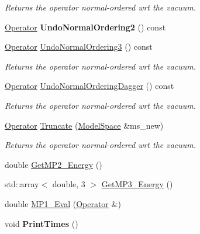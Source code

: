 \begin{DoxyCompactItemize}
\begin{DoxyCompactList}\small\item\em Returns the operator normal-\/ordered wrt the vacuum. \end{DoxyCompactList}\item 
\hypertarget{classOperator_a8681a11350622fd4c01ea48de0ef35e3}{\hyperlink{classOperator}{Operator} {\bfseries Undo\-Normal\-Ordering2} () const }\label{classOperator_a8681a11350622fd4c01ea48de0ef35e3}

\item 
\hypertarget{classOperator_a8a1f710b73b2a314877a275cff4d9e79}{\hyperlink{classOperator}{Operator} \hyperlink{classOperator_a8a1f710b73b2a314877a275cff4d9e79}{Undo\-Normal\-Ordering3} () const }\label{classOperator_a8a1f710b73b2a314877a275cff4d9e79}

\begin{DoxyCompactList}\small\item\em Returns the operator normal-\/ordered wrt the vacuum. \end{DoxyCompactList}\item 
\hypertarget{classOperator_a5ac0fc1807ea2cc48efe2e8ae8995c13}{\hyperlink{classOperator}{Operator} \hyperlink{classOperator_a5ac0fc1807ea2cc48efe2e8ae8995c13}{Undo\-Normal\-Ordering\-Dagger} () const }\label{classOperator_a5ac0fc1807ea2cc48efe2e8ae8995c13}

\begin{DoxyCompactList}\small\item\em Returns the operator normal-\/ordered wrt the vacuum. \end{DoxyCompactList}\item 
\hyperlink{classOperator}{Operator} \hyperlink{classOperator_ac2eb154c97ceff6f86cd3d24ddb4da1f}{Truncate} (\hyperlink{classModelSpace}{Model\-Space} \&ms\-\_\-new)
\begin{DoxyCompactList}\small\item\em Returns the operator normal-\/ordered wrt the vacuum. \end{DoxyCompactList}\item 
double \hyperlink{classOperator_ad7639b562a3df5215000677b1dc499e6}{Get\-M\-P2\-\_\-\-Energy} ()
\item 
std\-::array$<$ double, 3 $>$ \hyperlink{classOperator_a32beba2640f369ccec944622704fa676}{Get\-M\-P3\-\_\-\-Energy} ()
\item 
double \hyperlink{classOperator_a85d082bf283e568e1dd5bce4dc362d41}{M\-P1\-\_\-\-Eval} (\hyperlink{classOperator}{Operator} \&)
\item 
\hypertarget{classOperator_aa8280e8e2c6be73a9594789127b939c1}{void {\bfseries Print\-Times} ()}\label{classOperator_aa8280e8e2c6be73a9594789127b939c1}


\end{DoxyCompactItemize}
